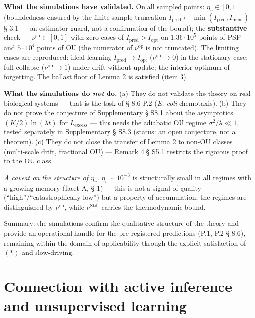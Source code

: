 \documentclass[pdflatex,sn-mathphys-ay]{sn-jnl}
\begin{document}
\textbf{What the simulations have validated.} On all sampled points: \(\eta_v \in [0,1]\) (boundedness ensured by the finite-sample truncation \(I_{\text{pred}} \gets \min(I_{\text{pred}}, I_{\text{mem}})\) § 3.1 --- an estimator guard, not a confirmation of the bound); the \textbf{substantive} check --- \(\nu^{\text{op}} \in [0,1]\) with zero cases of \(I_{\text{pred}} > I_{\text{opt}}\) on \(1.36 \cdot 10^5\) points of PSP and \(5 \cdot 10^4\) points of OU (the numerator of \(\nu^{\text{op}}\) is not truncated). The limiting cases are reproduced: ideal learning \(I_{\text{pred}} \to I_{\text{opt}}\) (\(\nu^{\text{op}} \to 0\)) in the stationary case; full collapse (\(\nu^{\text{op}} \to 1\)) under drift without update; the interior optimum of forgetting. The ballast floor of Lemma 2 is satisfied (item 3).



\textbf{What the simulations do \emph{not} do.} (a) They do not validate the theory on real biological systems --- that is the task of § 8.6 P.2 (\emph{E. coli} chemotaxis). (b) They do not prove the conjecture of Supplementary § S8.1 about the asymptotics \((K/2)\ln(\lambda t)\) for \(L_{\text{excess}}\) --- this needs the adiabatic OU regime \(\sigma^2/\lambda \ll 1\), tested separately in Supplementary § S8.3 (status: an open conjecture, not a theorem). (c) They do not close the transfer of Lemma 2 to non-OU classes (multi-scale drift, fractional OU) --- Remark 4 § S5.1 restricts the rigorous proof to the OU class.



\emph{A caveat on the structure of \(\eta_v\).} \(\eta_v \sim 10^{-3}\) is structurally small in all regimes with a growing memory (facet A, § 1) --- this is not a signal of quality (``high''/``catastrophically low'') but a property of accumulation; the regimes are distinguished by \(\nu^{\text{op}}\), while \(\nu^{\text{Still}}\) carries the thermodynamic bound.



Summary: the simulations confirm the qualitative structure of the theory and provide an operational handle for the pre-registered predictions (P.1, P.2 § 8.6), remaining within the domain of applicability through the explicit satisfaction of \((*)\) and slow-driving.



\section{Connection with active inference and unsupervised learning}\label{connection-with-active-inference-and-unsupervised-learning}
\end{document}
